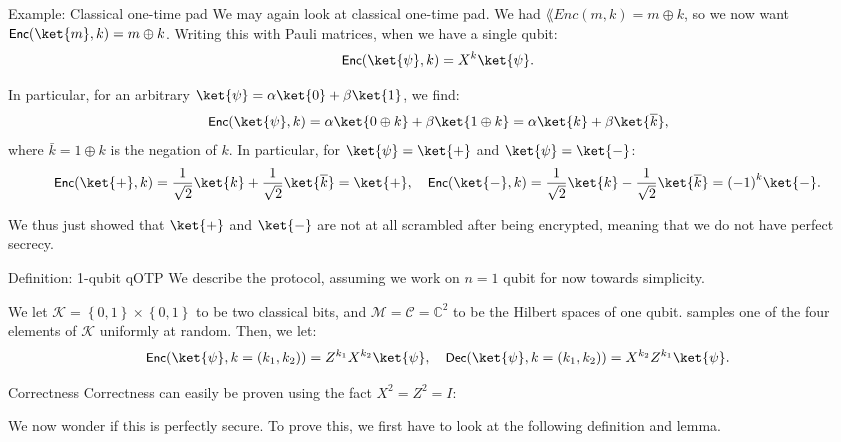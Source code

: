 \documentclass[a4paper]{article}
\begin{document}
\begin{parag}{Example: Classical one-time pad}
    We may again look at classical one-time pad. We had $\lang{Enc}\left(m, k\right) = m\oplus k$, so we now want $\lang{Enc}\left(\ket{m}, k\right) = m \oplus k$. Writing this with Pauli matrices, when we have a single qubit: 
    \[\lang{Enc}\left(\ket{\psi}, k\right) = X^k \ket{\psi}.\]
    
    In particular, for an arbitrary $\ket{\psi} = \alpha \ket{0} + \beta \ket{1}$, we find: 
    \[\lang{Enc}\left(\ket{\psi}, k\right) = \alpha \ket{0 \oplus k} + \beta \ket{1 \oplus k} = \alpha \ket{k} + \beta \ket{\bar{k}},\]
    where $\bar{k} = 1 \oplus k$ is the negation of $k$. In particular, for $\ket{\psi} = \ket{+}$ and $\ket{\psi} = \ket{-}$:
    \[\lang{Enc}\left(\ket{+}, k\right) = \frac{1}{\sqrt{2}} \ket{k} + \frac{1}{\sqrt{2}} \ket{\bar{k}} = \ket{+}, \mathspace \lang{Enc}\left(\ket{-}, k\right) = \frac{1}{\sqrt{2}} \ket{k} - \frac{1}{\sqrt{2}} \ket{\bar{k}} = \left(-1\right)^k\ket{-}.\]

    We thus just showed that $\ket{+}$ and $\ket{-}$ are not at all scrambled after being encrypted, meaning that we do not have perfect secrecy.
\end{parag}

\begin{parag}{Definition: 1-qubit qOTP}
    We describe the  protocol, assuming we work on $n = 1$ qubit for now towards simplicity.

    We let $\mathcal{K} = \left\{0, 1\right\} \times \left\{0, 1\right\}$ to be two classical bits, and $\mathcal{M} = \mathcal{C} =\mathbb{C}^2$ to be the Hilbert spaces of one qubit.  samples one of the four elements of $\mathcal{K}$ uniformly at random. Then, we let: 
    \[\lang{Enc}\left(\ket{\psi}, k = \left(k_1, k_2\right)\right) = Z^{k_1} X^{k_2} \ket{\psi}, \mathspace \lang{Dec}\left(\ket{\psi},  k = \left(k_1, k_2\right)\right) = X^{k_2} Z^{k_1} \ket{\psi}.\]

    \begin{subparag}{Correctness}
        Correctness can easily be proven using the fact $X^2 = Z^2 = I$: 

        We now wonder if this is perfectly secure. To prove this, we first have to look at the following definition and lemma.
    \end{subparag}
\end{parag}
\end{document}

